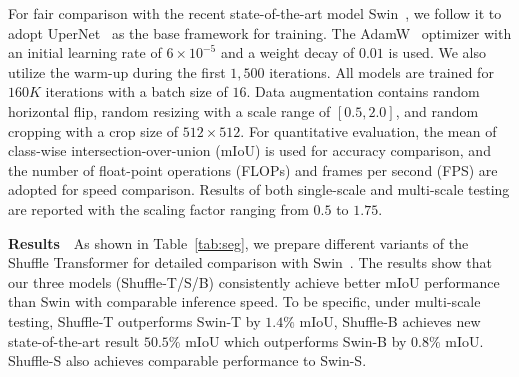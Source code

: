 \documentclass{article}
\begin{document}
For fair comparison with the recent state-of-the-art model Swin~\cite{liu2021Swin}, we follow it to adopt UperNet~\cite{xiao2018unified} as the base framework for training. The AdamW~\cite{loshchilov2017decoupled} optimizer with an initial learning rate of $6\times10^{-5}$ and a weight decay of $0.01$ is used. We also utilize the warm-up during the first $1,500$ iterations. All models are trained for $160K$ iterations with a batch size of $16$. Data augmentation contains random horizontal flip, random resizing with a scale range of $[0.5, 2.0]$, and random cropping with a crop size of $512\times512$. For quantitative evaluation, the mean of class-wise intersection-over-union (mIoU) is used for accuracy comparison, and the number of float-point operations (FLOPs) and frames per second (FPS) are adopted for speed comparison. Results of both single-scale and multi-scale testing are reported with the scaling factor ranging from $0.5$ to $1.75$. 



\textbf{Results}~~As shown in Table~\ref{tab:seg}, we prepare different variants of the Shuffle Transformer for detailed comparison with Swin~\cite{liu2021Swin}. The results show that our three models (Shuffle-T/S/B) consistently achieve better mIoU performance than Swin with comparable inference speed. To be specific, under multi-scale testing, Shuffle-T outperforms Swin-T by $1.4\%$ mIoU, Shuffle-B achieves new state-of-the-art result $50.5\%$ mIoU which outperforms Swin-B by $0.8\%$ mIoU. Shuffle-S also achieves comparable performance to Swin-S.
\end{document}
